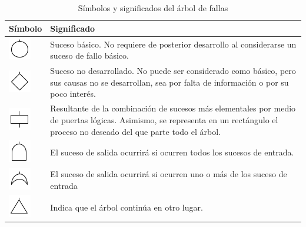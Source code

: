 \begin{table}[H]
\centering
\begin{tabular}{|l|p{7cm}|}
\hline
Símbolo & Significado \\
\hline
\includegraphics[scale=1]{images/arbol/basico.png} & Suceso básico. No requiere de posterior desarrollo al considerarse un suceso de fallo básico. \\ 
\hline
\includegraphics[scale=1]{images/arbol/nodesarrollado.png} & Suceso no desarrollado. No puede ser considerado como básico, pero sus causas no se desarrollan, sea por falta de información o por su poco interés.\\
\hline
\includegraphics[scale=1]{images/arbol/intermedio.png} & Resultante de la combinación de sucesos más elementales por medio de puertas lógicas. Asimismo, se representa en un rectángulo el proceso no deseado del que parte todo el árbol. \\
\hline
\includegraphics[scale=1]{images/arbol/puertay.png} & El suceso de salida ocurrirá si ocurren todos los sucesos de entrada.\\
\hline
\includegraphics[scale=1]{images/arbol/puertao.png} & El suceso de salida ocurrirá si ocurren uno o más de los suceso de entrada\\
\hline
\includegraphics[scale=1]{images/arbol/transferencia.png} & Indica que el árbol continúa en otro lugar. \\
\hline
\end{tabular}
\caption{Símbolos y significados del árbol de fallas \parencite{pique1998}}
\end{table}

